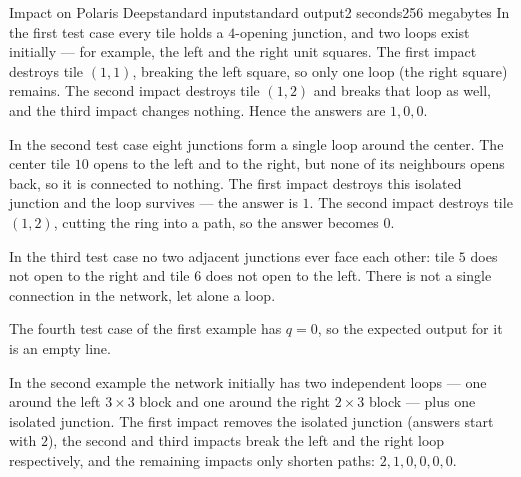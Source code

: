 \begin{problem}{Impact on Polaris Deep}{standard input}{standard output}{2 seconds}{256 megabytes}
In the first test case every tile holds a $4$-opening junction, and two loops exist initially --- for example, the left and the right unit squares. The first impact destroys tile $(1,1)$, breaking the left square, so only one loop (the right square) remains. The second impact destroys tile $(1,2)$ and breaks that loop as well, and the third impact changes nothing. Hence the answers are $1, 0, 0$.

In the second test case eight junctions form a single loop around the center. The center tile $10$ opens to the left and to the right, but none of its neighbours opens back, so it is connected to nothing. The first impact destroys this isolated junction and the loop survives --- the answer is $1$. The second impact destroys tile $(1,2)$, cutting the ring into a path, so the answer becomes $0$.

In the third test case no two adjacent junctions ever face each other: tile $5$ does not open to the right and tile $6$ does not open to the left. There is not a single connection in the network, let alone a loop.

The fourth test case of the first example has $q = 0$, so the expected output for it is an empty line.

In the second example the network initially has two independent loops --- one around the left $3 \times 3$ block and one around the right $2 \times 3$ block --- plus one isolated junction. The first impact removes the isolated junction (answers start with $2$), the second and third impacts break the left and the right loop respectively, and the remaining impacts only shorten paths: $2, 1, 0, 0, 0, 0$.


\end{problem}

